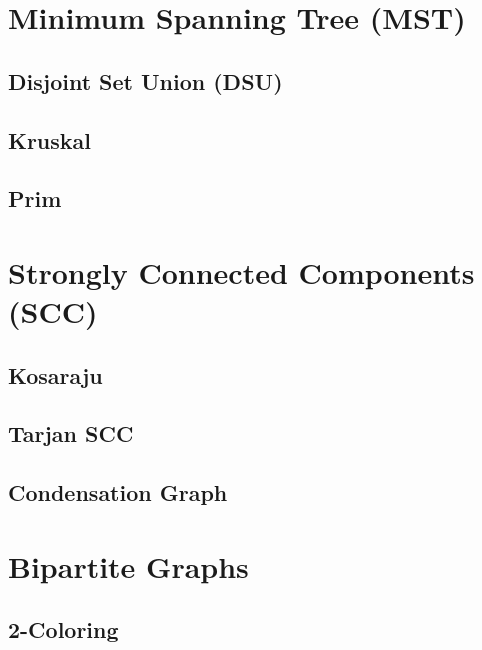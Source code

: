 \documentclass[10pt,a4paper,twocolumn]{article}
\begin{document}

\section{Minimum Spanning Tree (MST)}

\subsection{Disjoint Set Union (DSU)}

\subsection{Kruskal}

\subsection{Prim}



\section{Strongly Connected Components (SCC)}

\subsection{Kosaraju}

\subsection{Tarjan SCC}

\subsection{Condensation Graph}



\section{Bipartite Graphs}

\subsection{2-Coloring}
\end{document}

